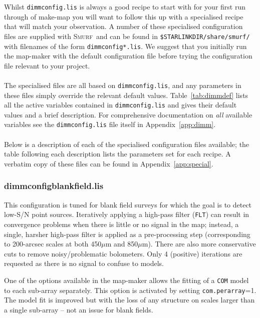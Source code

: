 \documentclass[twoside,11pt]{article}
\newcommand{\htmlref}[2]{#1}
\newcommand{\latexhtml}[2]{#1}
\newcommand{\xref}[3]{#1}
\renewcommand{\_}{\texttt{\symbol{95}}}
\newcommand{\smurf}{\xref{\textsc{Smurf}}{sun258}{}}
\newcommand{\cref}[3]{\latexhtml{#1~\ref{#2}}{\htmlref{#3}{#2}}}
\begin{document}
Whilst \texttt{dimmconfig.lis} is always a good recipe to start with
for your first run through of make-map you will want to follow this up
with a specialised recipe that will match your observation. A number
of these specialised configuration files are supplied with \smurf\ and
can be found in \texttt{\$STARLINK\_DIR/share/smurf/} with filenames
of the form \texttt{dimmconfig*.lis}. We suggest that you initially
run the map-maker with the default configuration file before trying
the configuration file relevant to your project.
\\ \\
The specialised files are all based on \texttt{dimmconfig.lis}, and
any parameters in these files simply override the relevant default
values.  \cref{Table}{tab:dimmdef}{A table} lists all the active variables
contained in \texttt{dimmconfig.lis} and gives their default values
and a brief description. For comprehensive documentation on \emph{all}
available variables see the \texttt{dimmconfig.lis} file itself in
\cref{Appendix}{app:dimm}{an appendix}.
\\ \\
Below is a description of each of the specialised configuration files
available; the table following each description lists the parameters
set for each recipe. A verbatim copy of these files can be found in
\cref{Appendix}{app:special}{Specialised Configuration Files}.

\subsubsection{dimmconfig\_blank\_field.lis}

This configuration is tuned for blank field surveys for which the goal
is to detect low-S/N point sources. Iteratively applying a high-pass
filter (\texttt{FLT}) can result in convergence problems when there is
little or no signal in the map; instead, a single, harsher high-pass
filter is applied as a pre-processing step (corresponding to
200-arcsec scales at both 450$\mu$m and 850$\mu$m). There are also
more conservative cuts to remove noisy/problematic bolometers. Only 4
(positive) iterations are requested as there is no signal to confuse
to models.

One of the options available in the map-maker allows the fitting of a
\texttt{COM} model to each sub-array separately. This option is
activated by setting \texttt{com.perarray}=1. The model fit is
improved but with the loss of any structure on scales larger than a
single sub-array -- not an issue for blank fields.
\end{document}
